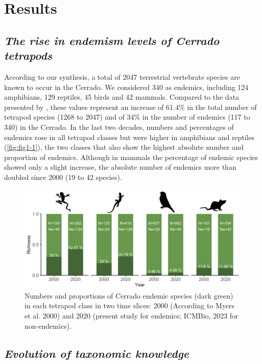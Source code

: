 \documentclass[12pt,openright,oneside,a4paper,english]{abntex2}
\begin{document}
\section{Results}
\subsection{\textit{The rise in endemism levels of Cerrado tetrapods}}

According to our synthesis, a total of 2047 terrestrial vertebrate species are known to occur in the Cerrado. We considered 340 as endemics, including 124 amphibians, 129 reptiles, 45 birds and 42 mammals. Compared to the data presented by \citet{Myers2000}, these values represent an increase of 61.4\% in the total number of tetrapod species (1268 to 2047) and of 34\% in the number of endemics (117 to 340) in the Cerrado. In the last two decades, numbers and percentages of endemics rose in all tetrapod classes but were higher in amphibians and reptiles (\autoref{fig:fig1-1}), the two classes that also show the highest absolute number and proportion of endemics. Although in mammals the percentage of endemic species showed only a slight increase, the absolute number of endemics more than doubled since 2000 (19 to 42 species).

\begin{figure}[htb]
	\centering
	\includegraphics[width=160mm]{Fig c1-1}
	\caption[Rise in endemism levels of Cerrado tetrapods]{\small Numbers and proportions of Cerrado endemic species (dark green) in each tetrapod class in two time slices: 2000 (According to Myers et al. 2000) and 2020 (present study for endemics; ICMBio, 2023 for non-endemics).}
	\label{fig:fig1-1}
\end{figure}

\subsection{\textit{Evolution of taxonomic knowledge}}
\end{document}
